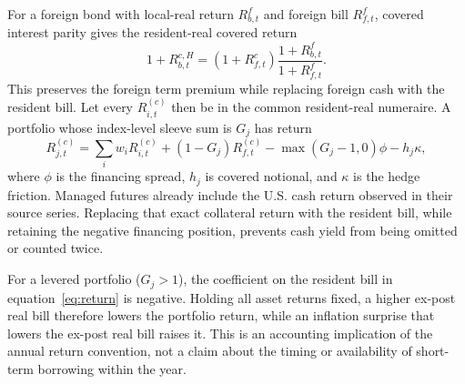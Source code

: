 \documentclass[11pt]{article}
\begin{document}
For a foreign bond with local-real return $R^f_{b,t}$ and foreign bill
$R^f_{f,t}$, covered interest parity gives the resident-real covered return
\begin{equation}
  1+R^{c,H}_{b,t}
  =(1+R^c_{f,t})\frac{1+R^f_{b,t}}{1+R^f_{f,t}}.
  \label{eq:covered}
\end{equation}
This preserves the foreign term premium while replacing foreign cash with the
resident bill. Let every $R^{(c)}_{i,t}$ then be in the common resident-real
numeraire. A portfolio whose index-level sleeve sum is $G_j$ has return
\begin{equation}
 R^{(c)}_{j,t}=\sum_i w_i R^{(c)}_{i,t}
 +(1-G_j)R^{(c)}_{f,t}
 -\max(G_j-1,0)\phi-h_j\kappa,
 \label{eq:return}
\end{equation}
where $\phi$ is the financing spread, $h_j$ is covered notional, and $\kappa$
is the hedge friction. Managed futures already include the U.S. cash return
observed in their source series. Replacing that exact collateral return with the
resident bill, while retaining the negative financing position, prevents cash
yield from being omitted or counted twice.

For a levered portfolio ($G_j>1$), the coefficient on the resident bill in
equation~\eqref{eq:return} is negative. Holding all asset returns fixed, a
higher ex-post real bill therefore lowers the portfolio return, while an
inflation surprise that lowers the ex-post real bill raises it. This is an
accounting implication of the annual return convention, not a claim about the
timing or availability of short-term borrowing within the year.
\end{document}
